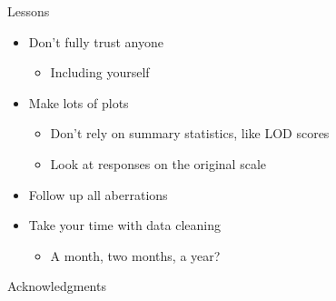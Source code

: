 \documentclass[12pt]{article}
\newcommand{\headsize}{\fontsize{35}{35} \selectfont}
\newcommand{\smallersize}{\fontsize{20}{25} \selectfont}
\newcommand{\smallestsize}{\fontsize{18}{22} \selectfont}
\begin{document}
\headsize \color{myyellow}
\hfill \begin{minipage}{5.75in}
\centering
Lessons
\end{minipage}

\vspace{20mm} \color{mywhite} \smallersize

\hfill \begin{minipage}{10in}

\begin{itemize}
\itemsep24pt

\item Don't fully trust anyone
{\smallestsize \color{myblue}
\begin{itemize}
\item Including yourself
\end{itemize} }

\item Make lots of plots
{\smallestsize \color{myblue}
\begin{itemize}
\item Don't rely on summary statistics, like LOD scores
\item Look at responses on the original scale
\end{itemize} }

\item Follow up all aberrations

\item Take your time with data cleaning
{\smallestsize \color{myblue}
\begin{itemize}
\item A month, two months, a year?
\end{itemize} }



\end{itemize}
\end{minipage}

\newpage

\headsize \color{myyellow}
\hfill \begin{minipage}{5.75in}
\centering
Acknowledgments
\end{minipage}

\vspace{2cm} \color{mywhite} \smallersize
\end{document}
